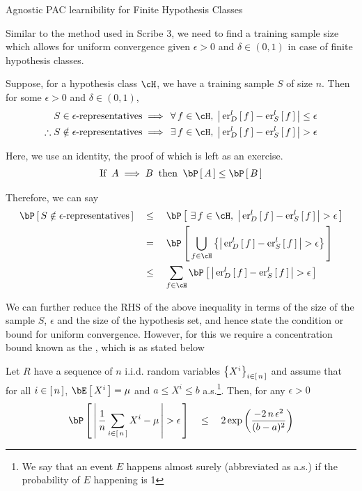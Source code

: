 \documentclass{article}
\begin{document}
\begin{ssection}[4]{Agnostic PAC learnibility for Finite Hypothesis Classes}

	Similar to the method used in Scribe 3, we need to find a training sample size which allows for uniform convergence given $\epsilon > 0$ and $\delta \in (0, 1)$ in case of finite hypothesis classes. \br

	Suppose, for a hypothesis class $\cH$, we have a training sample $S$ of size $n$. Then for some $\epsilon > 0$ and $\delta \in (0, 1)$,
	\begin{align*}
		S \in \epsilon\text{-representatives}					&\implies	\qforall f \in \cH,\; \abs{\err[_D^l]{f} - \err[_S^l]{f}} \le \epsilon \\
		\therefore S \notin \epsilon\text{-representatives}		&\implies	\qexists f \in \cH,\; \abs{\err[_D^l]{f} - \err[_S^l]{f}} > \epsilon
	\end{align*}

	Here, we use an identity, the proof of which is left as an exercise.
	\begin{align*}
		\mt{If} \: A \implies B \: \qmt{then} \: \prob{A} \le \prob{B}
	\end{align*} \sbr

	Therefore, we can say
	\begin{align*}
		\prob{S \notin \epsilon\text{-representatives}}	&\qle	\prob{\qexists f \in \cH,\; \abs{\err[_D^l]{f} - \err[_S^l]{f}} > \epsilon} \\
														&\eq	\prob{\bigcup_{f \in \cH} \set{\abs{\err[_D^l]{f} - \err[_S^l]{f}} > \epsilon}} \\
														&\qle	\sum_{f \in \cH} \prob{\abs{\err[_D^l]{f} - \err[_S^l]{f}} > \epsilon}
	\end{align*} \sbr

	We can further reduce the RHS of the above inequality in terms of the size of the sample $S$, $\epsilon$ and the size of the hypothesis set, and hence state the condition or bound for uniform convergence. However, for this we require a concentration bound known as the , which is as stated below

	\begin{theorem}
		Let $R$ have a sequence of $n$ i.i.d. random variables $\left\{ {X^i} \right\}_{i \in \left[\,{n}\,\right]}$ and assume that for all $i \in \left[\,{n}\,\right]$, $\E{X^i} = \mu$ and $a \le X^i \le b$ a.s.\footnote{We say that an event $E$ happens almost surely (abbreviated as a.s.) if the probability of $E$ happening is 1}. Then, for any $\epsilon > 0$
		\begin{equation}
			\prob{\abs{\frac{1}{n} \sum_{i \in \brac{n}} X^i - \mu} > \epsilon}	\qle	2 \texp{\frac{-2\,n\,\epsilon^2}{(b - a)^2}}
		\end{equation}
	\end{theorem}


\end{ssection}
\end{document}

